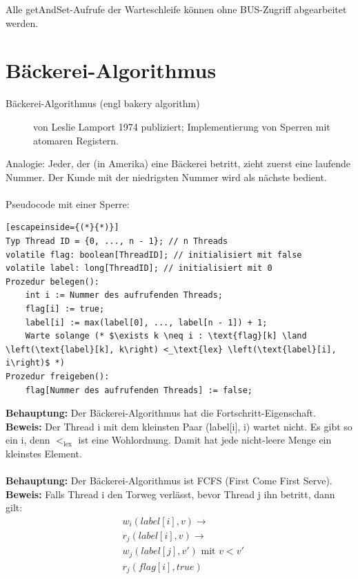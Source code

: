Alle getAndSet-Aufrufe der Warteschleife können ohne BUS-Zugriff abgearbeitet werden.

\section{Bäckerei-Algorithmus}
\begin{description}
	\item[Bäckerei-Algorithmus (engl bakery algorithm)] von Leslie Lamport 1974 publiziert; Implementierung von Sperren mit atomaren Registern.
\end{description}

Analogie: Jeder, der (in Amerika) eine Bäckerei betritt, zieht zuerst eine laufende Nummer. Der Kunde mit der niedrigsten Nummer wird als nächste bedient.\\
\\
Pseudocode mit einer Sperre:\\
\begin{lstlisting}[escapeinside={(*}{*)}]
Typ Thread ID = {0, ..., n - 1}; // n Threads
volatile flag: boolean[ThreadID]; // initialisiert mit false
volatile label: long[ThreadID]; // initialisiert mit 0
Prozedur belegen():
    int i := Nummer des aufrufenden Threads;
    flag[i] := true;
    label[i] := max(label[0], ..., label[n - 1]) + 1;
    Warte solange (* $\exists k \neq i : \text{flag}[k] \land \left(\text{label}[k], k\right) <_\text{lex} \left(\text{label}[i], i\right)$ *)
Prozedur freigeben():
    flag[Nummer des aufrufenden Threads] := false;
\end{lstlisting}
\textbf{Behauptung:} Der Bäckerei-Algorithmus hat die Fortschritt-Eigenschaft.\\
\textbf{Beweis:} Der Thread i mit dem kleinsten Paar (label[i], i) wartet nicht. Es gibt so ein i, denn $<_\text{lex}$ ist eine Wohlordnung. Damit hat jede nicht-leere Menge ein kleinstes Element.\\
\\
\textbf{Behauptung:} Der Bäckerei-Algorithmus ist FCFS (First Come First Serve).\\
\textbf{Beweis:} Falls Thread i den Torweg verlässt, bevor Thread j ihn betritt, dann gilt:
\begin{align*}
	& w_i\left(label[i], v\right) \rightarrow\\
	& r_j\left(label[i], v\right) \rightarrow\\
	& w_j\left(label[j], v'\right) \text{ mit } v < v'\\
	& r_j\left(flag[i], true\right)
\end{align*}
